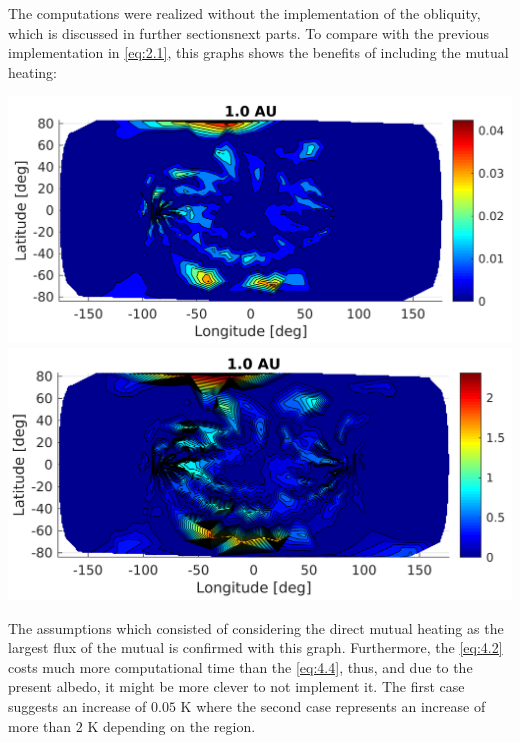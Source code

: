 The computations were realized without the implementation of the obliquity, which is discussed in further sectionsnext parts. To compare with the previous implementation in \autoref{eq:2.1}, this graphs shows the benefits of including the mutual heating:
\begin{center}
    \includegraphics[width=\linewidth]{rsc/mutual_W.png}
    \includegraphics[width=\linewidth]{rsc/mutual_Wu.png}
    \label{fig:4.4}
\end{center}
The assumptions which consisted of considering the direct mutual heating as the largest flux of the mutual is confirmed with this graph. Furthermore, the \autoref{eq:4.2} costs much more computational time than the \autoref{eq:4.4}, thus, and due to the present albedo, it might be more clever to not implement it. The first case suggests an increase of $0.05$ \si{\kelvin} where the second case represents an increase of more than $2$ \si{\kelvin} depending on the region.

